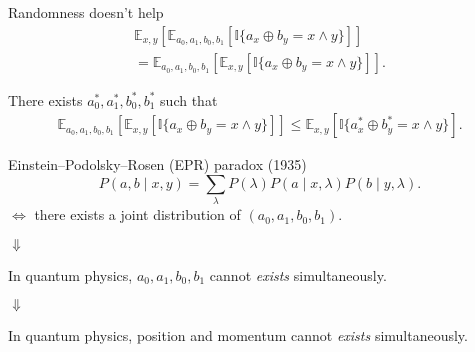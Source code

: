 \documentclass{beamer}
\newcommand\emm[1]{\textcolor{redorange}{{#1}}}
\newcommand\numc[1]{\textcolor{citation}{{\bf #1}}}
\begin{document}
\begin{frame}{Randomness doesn't help}
\begin{align*}
\mathbb{E}_{x,y}\left[\mathbb{E}_{a_0,a_1,b_0,b_1}\left[\mathbb{I}\{a_x\oplus b_y = x\wedge y\}\right]\right]\\
=
\mathbb{E}_{a_0,a_1,b_0,b_1}\left[\mathbb{E}_{x,y}\left[\mathbb{I}\{a_x\oplus b_y = x\wedge y\}\right]\right].
\end{align*}

\vspace{2em}
There exists $a^*_0,a^*_1,b^*_0,b^*_1$ such that
\begin{align*}
\mathbb{E}_{a_0,a_1,b_0,b_1}\left[\mathbb{E}_{x,y}\left[\mathbb{I}\{a_x\oplus b_y = x\wedge y\}\right]\right]
\le
\mathbb{E}_{x,y}\left[\mathbb{I}\{a^*_x\oplus b^*_y = x\wedge y\}\right].
\end{align*}
\end{frame}

\begin{frame}{Einstein--Podolsky--Rosen (EPR) paradox (1935)}
\begin{equation*}
P(a, b\mid x,y) = \sum_{\lambda} P(\lambda) P(a\mid x, \lambda) P(b\mid y,\lambda).
\end{equation*}
$\iff$
there exists a joint distribution of $(a_0,a_1,b_0,b_1)$.

\begin{center}
\Large
$\Downarrow$

\vspace{1.0em}
\normalsize
In quantum physics,
$a_0,a_1,b_0,b_1$ \emm{cannot \textit{exists}} simultaneously.

\vspace{1.0em}
\Large
$\Downarrow$

\vspace{1.0em}
\normalsize
In quantum physics,
position and momentum \emm{cannot \textit{exists}} simultaneously.
\end{center}

\end{frame}
\end{document}
